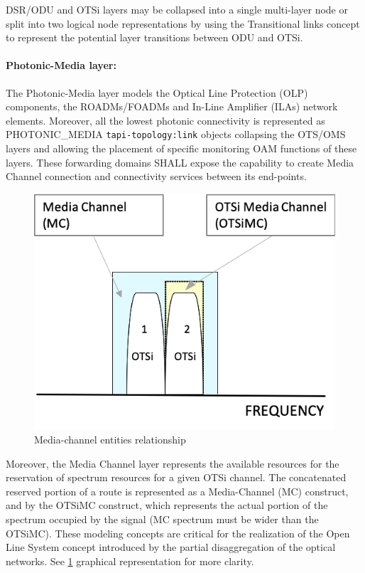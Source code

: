 \documentclass[a4paper,fleqn]{cas-dc}
\begin{document}
DSR/ODU and OTSi layers may be collapsed into a single multi-layer node or split into two logical node representations by using the Transitional links concept to represent the potential layer transitions between ODU and OTSi.

\paragraph{Photonic-Media layer:}
The Photonic-Media layer models the Optical Line Protection (OLP) components, the ROADMs/FOADMs and In-Line Amplifier (ILAs) network elements. Moreover, all the lowest photonic connectivity is represented as PHOTONIC\_MEDIA \texttt{tapi-topology:link} objects collapsing the OTS/OMS layers and allowing the placement of specific monitoring OAM functions of these layers. These forwarding domains SHALL expose the capability to create Media Channel connection and connectivity services between its end-points.

\begin{figure}
	\centering
		\includegraphics[scale=0.75]{figs/Media_channel.png}
	\caption{Media-channel entities relationship}
	\label{FIG:Media_channel}
\end{figure}

Moreover, the Media Channel layer represents the available resources for the reservation of spectrum resources for a given OTSi channel. The concatenated reserved portion of a route is represented as a Media-Channel (MC) construct, and by the OTSiMC construct, which represents the actual portion of the spectrum occupied by the signal (MC spectrum must be wider than the OTSiMC). These modeling concepts are critical for the realization of the Open Line System concept introduced by the partial disaggregation of the optical networks. See \cref{FIG:Media_channel} graphical representation for more clarity.
\end{document}
